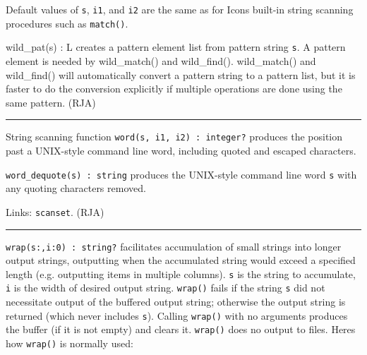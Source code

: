 Default values of \texttt{s}, \texttt{i1}, and \texttt{i2} are the same
as for Icon{\textquotesingle}s built-in string scanning procedures such
as \texttt{match()}.

\textsf{wild\_pat(s) : L} creates a pattern element list from pattern
string \texttt{s}. A pattern element is needed by
\textsf{wild\_match()} and \textsf{wild\_find()}.
\textsf{wild\_match()} and \textsf{wild\_find()} will automatically
convert a pattern string to a pattern list, but it is faster to do the
conversion explicitly if multiple operations are done using the same
pattern. (RJA)

\vspace{0.25cm}\hrule{}

String scanning function \texttt{word(s, i1, i2) : integer?} produces
the position past a UNIX-style command line word, including quoted and
escaped characters.

\texttt{word\_dequote(s) : string} produces the UNIX-style command line
word \texttt{s} with any quoting characters removed.

Links: \texttt{scanset}. (RJA)

\vspace{0.25cm}\hrule{}

\texttt{wrap}\texttt{(s:{\textquotedbl}{\textquotedbl},i:0)
: string?} facilitates accumulation of small strings into longer output
strings, outputting when the accumulated string would exceed a
specified length (e.g. outputting items in multiple columns).
\texttt{s} is the string to accumulate, \texttt{i} is the width of
desired output string. \texttt{wrap()} fails if the string \texttt{s}
did not necessitate output of the buffered output string; otherwise the
output string is returned (which never includes \texttt{s}). Calling
\texttt{wrap()} with no arguments produces the buffer (if it is not
empty) and clears it. \texttt{wrap()} does no output to files.
Here{\textquotesingle}s how \texttt{wrap()} is normally used:


